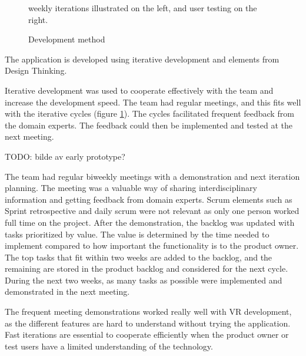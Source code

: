 \documentclass[a4paper]{report}
\begin{document}
\begin{figure}[h!]
    \centering
	\hfill
  \caption{Development method}
  \label{agile}
  \small
  weekly iterations illustrated on the left, and user testing on the right.
\end{figure}

The application is developed using iterative development and elements from Design Thinking.

Iterative development was used to cooperate effectively with the team and increase the development speed. The team had regular meetings, and this fits well with the iterative cycles (figure \ref{agile}). The cycles facilitated frequent feedback from the domain experts. The feedback could then be implemented and tested at the next meeting.

TODO: bilde av early prototype?

The team had regular biweekly meetings with a demonstration and next iteration planning. The meeting was a valuable way of sharing interdisciplinary information and getting feedback from domain experts. Scrum elements such as Sprint retrospective and daily scrum were not relevant as only one person worked full time on the project.
After the demonstration, the backlog was updated with tasks prioritized by value. The value is determined by the time needed to implement compared to how important the functionality is to the product owner. The top tasks that fit within two weeks are added to the backlog, and the remaining are stored in the product backlog and considered for the next cycle.
During the next two weeks, as many tasks as possible were implemented and demonstrated in the next meeting.

The frequent meeting demonstrations worked really well with VR development, as the different features are hard to understand without trying the application. Fast iterations are essential to cooperate efficiently when the product owner or test users have a limited understanding of the technology.
\end{document}
